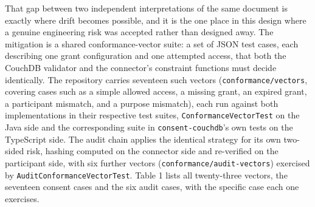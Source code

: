 That gap between two independent interpretations of the same document is exactly where drift becomes possible, and it is the one place in this design where a genuine engineering risk was accepted rather than designed away. The mitigation is a shared conformance-vector suite: a set of JSON test cases, each describing one grant configuration and one attempted access, that both the CouchDB validator and the connector's constraint functions must decide identically. The repository carries seventeen such vectors (\texttt{conformance/vectors}, covering cases such as a simple allowed access, a missing grant, an expired grant, a participant mismatch, and a purpose mismatch), each run against both implementations in their respective test suites, \texttt{ConformanceVectorTest} on the Java side and the corresponding suite in \texttt{consent-couchdb}'s own tests on the TypeScript side. The audit chain applies the identical strategy for its own two-sided risk, hashing computed on the connector side and re-verified on the participant side, with six further vectors (\texttt{conformance/audit-vectors}) exercised by \texttt{AuditConformanceVectorTest}. Table 1 lists all twenty-three vectors, the seventeen consent cases and the six audit cases, with the specific case each one exercises.


